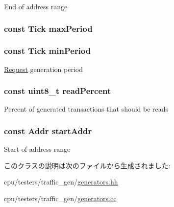 \label{classRandomGen_a1f198116a3da3ee4d73abf4760f70815}
End of address range \hypertarget{classRandomGen_a1c8c13cc371c24fa5cbb14c737c97f9d}{
\subsubsection[{maxPeriod}]{\setlength{\rightskip}{0pt plus 5cm}const {\bf Tick} {\bf maxPeriod}}}
\label{classRandomGen_a1c8c13cc371c24fa5cbb14c737c97f9d}
\hypertarget{classRandomGen_a4e49eae3c2467df5de83a296f8123619}{
\subsubsection[{minPeriod}]{\setlength{\rightskip}{0pt plus 5cm}const {\bf Tick} {\bf minPeriod}}}
\label{classRandomGen_a4e49eae3c2467df5de83a296f8123619}
\hyperlink{classRequest}{Request} generation period \hypertarget{classRandomGen_af72793641cb115852317a23ca19dc514}{
\subsubsection[{readPercent}]{\setlength{\rightskip}{0pt plus 5cm}const uint8\_\-t {\bf readPercent}}}
\label{classRandomGen_af72793641cb115852317a23ca19dc514}
Percent of generated transactions that should be reads \hypertarget{classRandomGen_a6aeb968ddd05c079215ef147ed22708a}{
\subsubsection[{startAddr}]{\setlength{\rightskip}{0pt plus 5cm}const {\bf Addr} {\bf startAddr}}}
\label{classRandomGen_a6aeb968ddd05c079215ef147ed22708a}
Start of address range 

このクラスの説明は次のファイルから生成されました:\begin{DoxyCompactItemize}
\item 
cpu/testers/traffic\_\-gen/\hyperlink{generators_8hh}{generators.hh}\item 
cpu/testers/traffic\_\-gen/\hyperlink{generators_8cc}{generators.cc}\end{DoxyCompactItemize}
